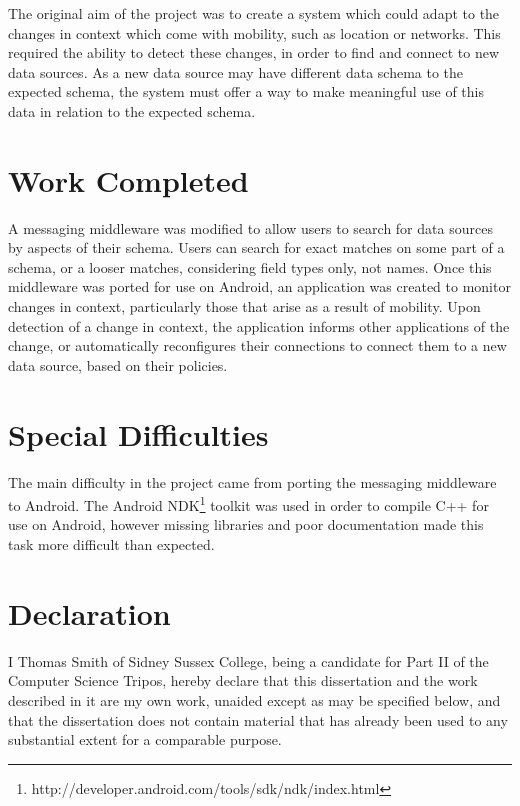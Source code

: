 \documentclass[12pt,twoside,notitlepage]{report}
\begin{document}
The original aim of the project was to create a system which could adapt to the changes in context which come with mobility, such as location or networks. 
This required the ability to detect these changes, in order to find and connect to new data sources. 
As a new data source may have different data schema to the expected schema, the system must offer a way to make meaningful use of this data in relation to the expected schema.

\section*{Work Completed}

A messaging middleware was modified to allow users to search for data sources by aspects of their schema. Users can search for exact matches on some part of a schema, or a looser matches, considering field types only, not names.
Once this middleware was ported for use on Android, an application was created to monitor changes in context, particularly those that arise as a result of mobility. Upon detection of a change in context, the application informs other applications of the change, or automatically reconfigures their connections to connect them to a new data source, based on their policies.

\section*{Special Difficulties}

The main difficulty in the project came from porting the messaging middleware to Android. The Android NDK\footnote{http://developer.android.com/tools/sdk/ndk/index.html} toolkit was used in order to compile C++ for use on Android, however missing libraries and poor documentation made this task more difficult than expected.
 
\newpage
\section*{Declaration}

I Thomas Smith of Sidney Sussex College, being a candidate for Part II of the Computer
Science Tripos, hereby declare that this dissertation and the work described in it are my own work,
unaided except as may be specified below, and that the dissertation
does not contain material that has already been used to any substantial
extent for a comparable purpose.

\bigskip
\bigskip
{}
\end{document}
